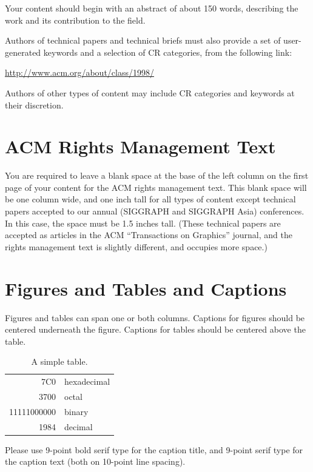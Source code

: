 \documentclass[tog]{acmsiggraph}
\begin{document}
Your content should begin with an abstract of about 150 words,
describing the work and its contribution to the field.

Authors of technical papers and technical briefs must also provide a
set of user-generated keywords and a selection of CR categories, from
the following link:

{\small\url{http://www.acm.org/about/class/1998/}}

Authors of other types of content may include CR categories and
keywords at their discretion.

\section{ACM Rights Management Text}

You are required to leave a blank space at the base of the left column
on the first page of your content for the ACM rights management
text. This blank space will be one column wide, and one inch tall for
all types of content except technical papers accepted to our annual
(SIGGRAPH and SIGGRAPH Asia) conferences. In this case, the space must
be 1.5 inches tall. (These technical papers are accepted as articles
in the ACM ``Transactions on Graphics'' journal, and the rights
management text is slightly different, and occupies more space.)

\section{Figures and Tables and Captions}

Figures and tables can span one or both columns. Captions for figures
should be centered underneath the figure. Captions for tables should
be centered above the table.

\begin{table}[ht]
  \centering
  \caption{A simple table.}
  \begin{tabular}{|r|l|}
    \hline
    7C0 & hexadecimal \\
    3700 & octal \\ \cline{2-2}
    11111000000 & binary \\
    \hline \hline
    1984 & decimal \\
    \hline
  \end{tabular}
\end{table}
  
Please use 9-point bold serif type for the caption title, and 9-point
serif type for the caption text (both on 10-point line spacing).
\end{document}
